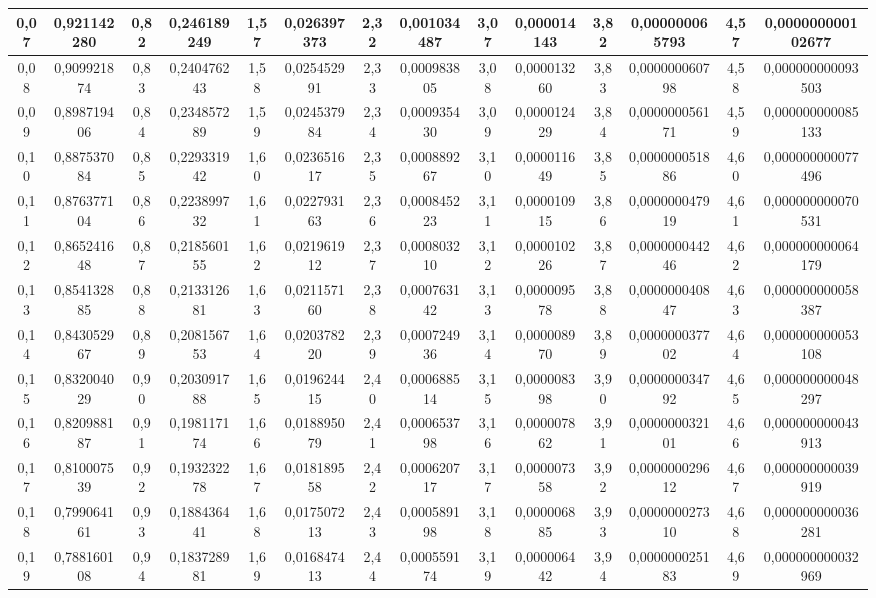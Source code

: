 \documentclass[a4paper,8pt]{article}
\begin{document}
\begin{table}[!ht]
{\begin{tabular}{|c|c||c|c||c|c||c|c||c|c||c|c||c|c||}
        0,07 & 0,921142280 & 0,82 & 0,246189249 & 1,57 & 0,026397373 & 2,32 & 0,001034487 & 3,07 & 0,000014143 & 3,82 & 0,000000065793 & 4,57 & 0,000000000102677 \\ \hline
        0,08 & 0,909921874 & 0,83 & 0,240476243 & 1,58 & 0,025452991 & 2,33 & 0,000983805 & 3,08 & 0,000013260 & 3,83 & 0,000000060798 & 4,58 & 0,000000000093503 \\ \hline
        0,09 & 0,898719406 & 0,84 & 0,234857289 & 1,59 & 0,024537984 & 2,34 & 0,000935430 & 3,09 & 0,000012429 & 3,84 & 0,000000056171 & 4,59 & 0,000000000085133 \\ \hline
        0,10 & 0,887537084 & 0,85 & 0,229331942 & 1,60 & 0,023651617 & 2,35 & 0,000889267 & 3,10 & 0,000011649 & 3,85 & 0,000000051886 & 4,60 & 0,000000000077496 \\ \hline
        0,11 & 0,876377104 & 0,86 & 0,223899732 & 1,61 & 0,022793163 & 2,36 & 0,000845223 & 3,11 & 0,000010915 & 3,86 & 0,000000047919 & 4,61 & 0,000000000070531 \\ \hline
        0,12 & 0,865241648 & 0,87 & 0,218560155 & 1,62 & 0,021961912 & 2,37 & 0,000803210 & 3,12 & 0,000010226 & 3,87 & 0,000000044246 & 4,62 & 0,000000000064179 \\ \hline
        0,13 & 0,854132885 & 0,88 & 0,213312681 & 1,63 & 0,021157160 & 2,38 & 0,000763142 & 3,13 & 0,000009578 & 3,88 & 0,000000040847 & 4,63 & 0,000000000058387 \\ \hline
        0,14 & 0,843052967 & 0,89 & 0,208156753 & 1,64 & 0,020378220 & 2,39 & 0,000724936 & 3,14 & 0,000008970 & 3,89 & 0,000000037702 & 4,64 & 0,000000000053108 \\ \hline
        0,15 & 0,832004029 & 0,90 & 0,203091788 & 1,65 & 0,019624415 & 2,40 & 0,000688514 & 3,15 & 0,000008398 & 3,90 & 0,000000034792 & 4,65 & 0,000000000048297 \\ \hline
        0,16 & 0,820988187 & 0,91 & 0,198117174 & 1,66 & 0,018895079 & 2,41 & 0,000653798 & 3,16 & 0,000007862 & 3,91 & 0,000000032101 & 4,66 & 0,000000000043913 \\ \hline
        0,17 & 0,810007539 & 0,92 & 0,193232278 & 1,67 & 0,018189558 & 2,42 & 0,000620717 & 3,17 & 0,000007358 & 3,92 & 0,000000029612 & 4,67 & 0,000000000039919 \\ \hline
        0,18 & 0,799064161 & 0,93 & 0,188436441 & 1,68 & 0,017507213 & 2,43 & 0,000589198 & 3,18 & 0,000006885 & 3,93 & 0,000000027310 & 4,68 & 0,000000000036281 \\ \hline
        0,19 & 0,788160108 & 0,94 & 0,183728981 & 1,69 & 0,016847413 & 2,44 & 0,000559174 & 3,19 & 0,000006442 & 3,94 & 0,000000025183 & 4,69 & 0,000000000032969 \\ \hline

\end{tabular}}
\end{table}
\end{document}
